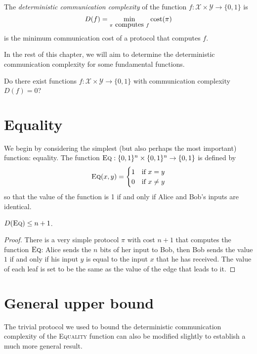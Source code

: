 \begin{definition}
The \emph{deterministic communication complexity} of the function $f : \mathcal{X} \times \mathcal{Y} \to \{0,1\}$ is
\[
D(f) = \min_{\pi \mbox{ computes } f} \mathrm{cost}(\pi)
\]
is the minimum communication cost of a protocol that computes $f$.
\end{definition}

In the rest of this chapter, we will aim to determine the deterministic communication complexity for some fundamental functions.

\exercises

\begin{exercise} %
Do there exist functions $f : \mathcal{X} \times \mathcal{Y} \to \{0,1\}$ with  communication complexity $D(f) = 0$?
\end{exercise}


\newpage \section{Equality}
We begin by considering the simplest (but also perhaps the most important) function: equality. The function $\textsc{Eq} : \{0,1\}^n \times \{0,1\}^n \to \{0,1\}$ is defined by
\[
\textsc{Eq}(x,y) = \begin{cases}
1 & \mbox{if } x = y \\
0 & \mbox{if } x \neq y
\end{cases}
\]
so that the value of the function is 1 if and only if Alice and Bob's inputs are identical.

\begin{theorem}
$D(\textsc{Eq}) \le n + 1$.
\end{theorem}

\begin{proof}
There is a very simple protocol $\pi$ with cost $n+1$ that computes the function $\textsc{Eq}$: Alice sends the $n$ bits of her input to Bob, then Bob sends the value $1$ if and only if his input $y$ is equal to the input $x$ that he has received. The value of each leaf is set to be the same as the value of the edge that leads to it.
\end{proof}


\newpage \section{General upper bound}
The trivial protocol we used to bound the deterministic communication complexity of the \textsc{Equality} function can also be modified slightly to establish a much more general result.

